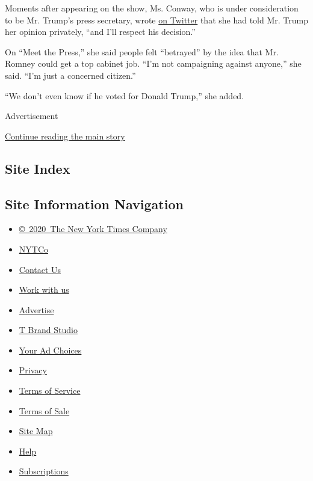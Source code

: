 Moments after appearing on the show, Ms. Conway, who is under
consideration to be Mr. Trump's press secretary, wrote
\href{https://twitter.com/KellyannePolls/status/802884826520907776}{on
Twitter} that she had told Mr. Trump her opinion privately, ``and I'll
respect his decision.''

On ``Meet the Press,'' she said people felt ``betrayed'' by the idea
that Mr. Romney could get a top cabinet job. ``I'm not campaigning
against anyone,'' she said. ``I'm just a concerned citizen.''

``We don't even know if he voted for Donald Trump,'' she added.

Advertisement

\protect\hyperlink{after-bottom}{Continue reading the main story}

\hypertarget{site-index}{%
\subsection{Site Index}\label{site-index}}

\hypertarget{site-information-navigation}{%
\subsection{Site Information
Navigation}\label{site-information-navigation}}

\begin{itemize}
\tightlist
\item
  \href{https://help.nytimes3xbfgragh.onion/hc/en-us/articles/115014792127-Copyright-notice}{©~2020~The
  New York Times Company}
\end{itemize}

\begin{itemize}
\tightlist
\item
  \href{https://www.nytco.com/}{NYTCo}
\item
  \href{https://help.nytimes3xbfgragh.onion/hc/en-us/articles/115015385887-Contact-Us}{Contact
  Us}
\item
  \href{https://www.nytco.com/careers/}{Work with us}
\item
  \href{https://nytmediakit.com/}{Advertise}
\item
  \href{http://www.tbrandstudio.com/}{T Brand Studio}
\item
  \href{https://www.nytimes3xbfgragh.onion/privacy/cookie-policy\#how-do-i-manage-trackers}{Your
  Ad Choices}
\item
  \href{https://www.nytimes3xbfgragh.onion/privacy}{Privacy}
\item
  \href{https://help.nytimes3xbfgragh.onion/hc/en-us/articles/115014893428-Terms-of-service}{Terms
  of Service}
\item
  \href{https://help.nytimes3xbfgragh.onion/hc/en-us/articles/115014893968-Terms-of-sale}{Terms
  of Sale}
\item
  \href{https://spiderbites.nytimes3xbfgragh.onion}{Site Map}
\item
  \href{https://help.nytimes3xbfgragh.onion/hc/en-us}{Help}
\item
  \href{https://www.nytimes3xbfgragh.onion/subscription?campaignId=37WXW}{Subscriptions}
\end{itemize}
